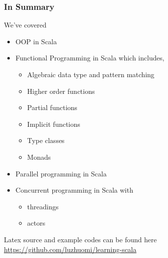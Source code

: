 \documentclass{beamer}
\begin{document}
\begin{frame}[fragile]
\frametitle{In Summary}
We've covered
\begin{itemize}
 \item OOP in Scala
 \item Functional Programming in Scala which includes,
  \begin{itemize}
  \item Algebraic data type and pattern matching
  \item Higher order functions
  \item Partial functions
  \item Implicit functions
  \item Type classes
  \item Monads
  \end{itemize}
 \item Parallel programming in Scala
 \item Concurrent programming in Scala with 
     \begin{itemize}
        \item threadings
        \item actors
     \end{itemize}
\end{itemize}
Latex source and example codes can be found here \\
\url{https://github.com/luzhuomi/learning-scala}
\end{frame}
\end{document}
